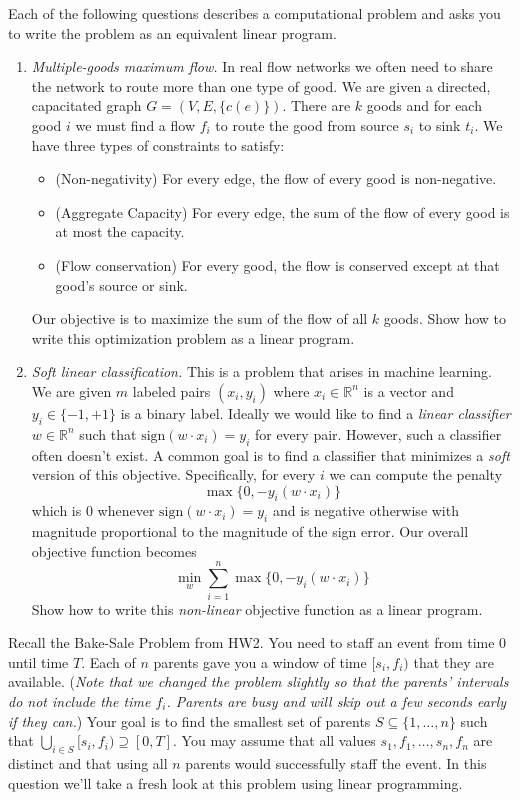 \documentclass[11pt]{article}
\theoremstyle{definition}
\begin{document}
\begin{enumerate}[leftmargin=0pt, itemsep=3ex]
\problemitem Each of the following questions describes a computational problem and asks you to write the problem as an equivalent linear program.
    \begin{enumerate}[leftmargin=0pt, itemsep=1ex]
        \item \emph{Multiple-goods maximum flow.} In real flow networks we often need to share the network to route more than one type of good.  We are given a directed, capacitated graph $G = (V,E,\{c(e)\})$.  There are $k$ goods and for each good $i$ we must find a flow $f_i$ to route the good from source $s_i$ to sink $t_i$.  We have three types of constraints to satisfy:
        \begin{itemize}[nosep]
            \item (Non-negativity) For every edge, the flow of every good is non-negative.
            \item (Aggregate Capacity) For every edge, the sum of the flow of every good is at most the capacity.
            \item (Flow conservation) For every good, the flow is conserved except at that good's source or sink.
        \end{itemize}
        Our objective is to maximize the sum of the flow of all $k$ goods.  Show how to write this optimization problem as a linear program.
        
        \item \emph{Soft linear classification.} This is a problem that arises in machine learning.  We are given $m$ labeled pairs $(x_i,y_i)$ where $x_i \in \mathbb{R}^n$ is a vector and $y_i \in \{-1,+1\}$ is a binary label.  Ideally we would like to find a \emph{linear classifier} $w \in \mathbb{R}^n$ such that $\mathrm{sign}(w \cdot x_i) = y_i$ for every pair.  However, such a classifier often doesn't exist.  A common goal is to find a classifier that minimizes a \emph{soft} version of this objective.  Specifically, for every $i$ we can compute the penalty $$\max\{ 0, -y_i(w \cdot x_i) \}$$ which is $0$ whenever $\mathrm{sign}(w \cdot x_i) = y_i$ and is negative otherwise with magnitude proportional to the magnitude of the sign error.  Our overall objective function becomes
        $$
            \min_{w} \sum_{i=1}^{n} \max\{0, -y_i(w \cdot x_i)\}
        $$
        Show how to write this \emph{non-linear} objective function as a linear program.
    \end{enumerate}

\problemitem
Recall the Bake-Sale Problem from HW2.  You need to staff an event from time $0$ until time $T$.  Each of $n$ parents gave you a window of time $[s_i,f_i)$ that they are available.  (\emph{Note that we changed the problem slightly so that the parents' intervals do not include the time $f_i$.  Parents are busy and will skip out a few seconds early if they can.})  Your goal is to find the smallest set of parents $S \subseteq \{1,\dots,n\}$ such that $\bigcup_{i \in S} [s_i, f_i) \supseteq [0,T]$.  You may assume that all values $s_1,f_1,\dots,s_n,f_n$ are distinct and that using all $n$ parents would successfully staff the event.  In this question we'll take a fresh look at this problem using linear programming.


\end{enumerate}
\end{document}
